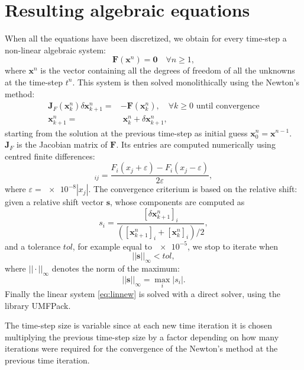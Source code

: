 \section{Resulting algebraic equations} \label{sec:algeq}
When all the equations have been discretized, we obtain for every 
time-step a non-linear algebraic system:
\begin{equation}
	\mathbf{F}(\mathbf{x}^n) = \mathbf{0} \quad \forall n\geq 1,
\end{equation}
where $\mathbf{x}^n$ is the vector containing all the degrees of freedom of all the unknowns at the time-step $t^n$. This system is then solved monolithically using the Newton's method:
\begin{align}
\label{eq:linnew}\mathbf{J}_F(\mathbf{x}^n_k) \delta \mathbf{x}^n_{k+1} = &-\mathbf{F}(\mathbf{x}_k^n), \quad \text{$\forall k\geq 0$ until 
	convergence}\\
\mathbf{x}^n_{k+1} = &\;\mathbf{x}^n_k + \delta \mathbf{x}^n_{k+1},
\end{align}
starting from the solution at the previous time-step as initial guess $\mathbf{x}_0^n = \mathbf{x}^{n-1}$.
$\mathbf{J}_F$ is the Jacobian matrix of $\mathbf{F}$. Its entries are computed numerically using centred finite differences:
\begin{equation}
[\mathbf{J}_F]_{ij} = \frac{F_i(x_j + \varepsilon) - F_i(x_j - \varepsilon)}{2\varepsilon},
\end{equation}
where $\varepsilon=\num{e-8}|x_j|$. The convergence criterium is based on the relative shift: given a relative shift vector $\mathbf{s}$, whose components are computed as
\begin{equation}
	s_i = \frac{[\delta \mathbf{x}^n_{k+1}]_i}{([\mathbf{x}^n_{k+1}]_i + [\mathbf{x}^n_{k}]_i) / 2},
\end{equation}
and a tolerance $tol$, for example equal to $\num{e-5}$, we stop to iterate when
\begin{equation}
	|\!|\mathbf{s}|\!|_\infty < tol,
\end{equation}
where $|\!| \cdot |\!|_	\infty$ denotes the norm of the maximum:
\begin{equation}
	|\!|\mathbf{s}|\!|_\infty = \max_i |s_i|.
\end{equation}
Finally the linear system \eqref{eq:linnew} is solved with a direct solver, using the library UMFPack.

The time-step size is variable since at each new time iteration it is chosen 
multiplying the previous time-step size by a factor depending on how many iterations were required for the 
convergence of the Newton's method at the previous time iteration.